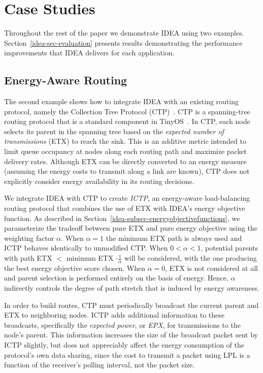 \section{Case Studies}
\label{idea-sec-casestudies}

Throughout the rest of the paper we demonstrate IDEA using two examples.
Section~\ref{idea-sec-evaluation} presents results demonstrating the
performance improvements that IDEA delivers for each application.

\subsection{Energy-Aware Routing}

The second example shows how to integrate IDEA with an existing routing
protocol, namely the Collection Tree Protocol (CTP)~\cite{ctp-sensys09}. CTP
is a spanning-tree routing protocol that is a standard component in
TinyOS~\cite{tinyos-asplos00}. In CTP, each node selects its parent in the
spanning tree based on the \textit{expected number of transmissions} (ETX) to
reach the sink. This is an additive metric intended to limit queue occupancy
at nodes along each routing path and maximize packet delivery rates. Although
ETX can be directly converted to an energy measure (assuming the energy costs
to transmit along a link are known), CTP does not explicitly consider energy
availability in its routing decisions.

We integrate IDEA with CTP to create \textit{ICTP}, an energy-aware
load-balancing routing protocol that combines the use of ETX with IDEA's
energy objective function. As described in
Section~\ref{idea-subsec-energyobjectivefunctions}, we parameterize the
tradeoff between pure ETX and pure energy objective using the weighting
factor $\alpha$. When $\alpha = 1$ the minimum ETX path is always used and
ICTP behaves identically to unmodified CTP. When $0 < \alpha < 1$, potential
parents with path ETX $<$ minimum ETX $\cdot \frac{1}{\alpha}$ will be
considered, with the one producing the best energy objective score chosen.
When $\alpha = 0$, ETX is not considered at all and parent selection is
performed entirely on the basis of energy. Hence, $\alpha$ indirectly
controls the degree of path stretch that is induced by energy awareness. 

In order to build routes, CTP must periodically broadcast the current parent
and ETX to neighboring nodes. ICTP adds additional information to these
broadcasts, specifically the \textit{expected power}, or \textit{EPX}, for
transmissions to the node's parent. This information increases the size of
the broadcast packet sent by ICTP slightly, but does not appreciably affect
the energy consumption of the protocol's own data sharing, since the cost to
transmit a packet using LPL is a function of the receiver's polling interval,
not the packet size.


